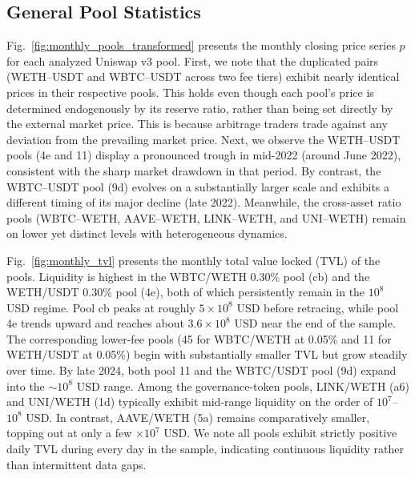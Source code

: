 \documentclass[anonymous]{lipics-v2021}
\begin{document}
{\begin{figure}[t]
\end{figure}

\subsection{General Pool Statistics}
\label{sec:general_statistics}

Fig.~\ref{fig:monthly_pools_transformed} presents the monthly closing price series $p$ for each analyzed Uniswap v3 pool. 
First, we note that the duplicated pairs (WETH--USDT and WBTC--USDT across two fee tiers) exhibit nearly identical prices in their respective pools. 
This holds even though each pool’s price is determined endogenously by its reserve ratio, rather than being set directly by the external market price.
This is because arbitrage traders trade against any deviation from the prevailing market price. Next, we observe the WETH--USDT pools (4e and 11) display a pronounced trough in mid-2022 (around June 2022), consistent with the sharp market drawdown in that period. By contrast, the WBTC--USDT pool (9d) evolves on a substantially larger scale and exhibits a different timing of its major decline (late 2022). Meanwhile, the cross-asset ratio pools (WBTC--WETH, AAVE--WETH, LINK--WETH, and UNI--WETH) remain on lower yet distinct levels with heterogeneous dynamics. 

Fig.~\ref{fig:monthly_tvl} presents the monthly total value locked (TVL) of the pools. 
Liquidity is highest in the WBTC/WETH 0.30\% pool (cb) and the WETH/USDT 0.30\% pool (4e), both of which persistently remain in the $10^{8}$ USD regime. 
Pool cb peaks at roughly $5\times10^{8}$ USD before retracing, while pool 4e trends upward and reaches about $3.6\times10^{8}$ USD near the end of the sample.
The corresponding lower-fee pools (45 for WBTC/WETH at 0.05\% and 11 for WETH/USDT at 0.05\%) begin with substantially smaller TVL but grow steadily over time. 
By late 2024, both pool 11 and the WBTC/USDT pool (9d) expand into the $\sim10^{8}$ USD range. 
Among the governance-token pools, LINK/WETH (a6) and UNI/WETH (1d) typically exhibit mid-range liquidity on the order of $10^{7}$--$10^{8}$ USD. 
In contrast, AAVE/WETH (5a) remains comparatively smaller, topping out at only a few $\times10^{7}$ USD.
We note all pools exhibit strictly positive daily TVL during every day in the sample, indicating continuous liquidity rather than intermittent data gaps.



}
\end{document}
